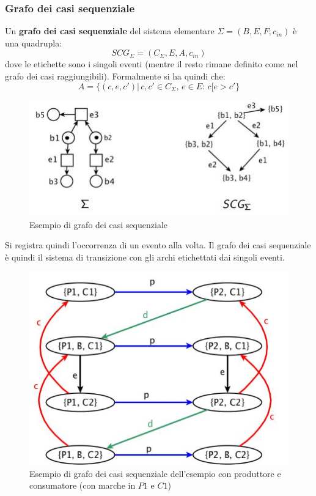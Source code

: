 \subsubsection{Grafo dei casi sequenziale}
\begin{definizione}
  Un \textbf{grafo dei casi sequenziale} del sistema elementare
  $\Sigma=(B, E, F;c_{in})$ è una quadrupla:
  \[SCG_\Sigma=(C_\Sigma, E, A, c_{in})\]
  dove le etichette sono i singoli eventi (mentre il resto rimane definito come
  nel grafo dei casi raggiungibili). Formalmente si ha quindi che:
  \[A=\{(c, e, c')|\, c, c'\in C_\Sigma,\, e\in E:\, c[e>c'\}\]
  \begin{figure}[H]
    \centering
    \includegraphics[scale = 0.6]{img/seq3.jpg}
    \caption{Esempio di grafo dei casi sequenziale}
  \end{figure}
  Si registra quindi l'occorrenza di un evento alla volta. Il grafo dei casi
  sequenziale è quindi il sistema di transizione con gli archi etichettati dai
  singoli eventi.
  \begin{figure}[H]
    \centering
    \includegraphics[scale = 0.4]{img/seqq.jpg}
    \caption{Esempio di grafo dei casi sequenziale dell'esempio con produttore
      e consumatore (con marche in $P1$ e $C1$)}
  \end{figure}
\end{definizione} \vspace{5mm} %
